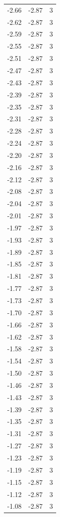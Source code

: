 \begin{longtable}{lrr}
  -2.66 & -2.87 & 3 \\
  -2.62 & -2.87 & 3 \\
  -2.59 & -2.87 & 3 \\
  -2.55 & -2.87 & 3 \\
  -2.51 & -2.87 & 3 \\
  -2.47 & -2.87 & 3 \\
  -2.43 & -2.87 & 3 \\
  -2.39 & -2.87 & 3 \\
  -2.35 & -2.87 & 3 \\
  -2.31 & -2.87 & 3 \\
  -2.28 & -2.87 & 3 \\
  -2.24 & -2.87 & 3 \\
  -2.20 & -2.87 & 3 \\
  -2.16 & -2.87 & 3 \\
  -2.12 & -2.87 & 3 \\
  -2.08 & -2.87 & 3 \\
  -2.04 & -2.87 & 3 \\
  -2.01 & -2.87 & 3 \\
  -1.97 & -2.87 & 3 \\
  -1.93 & -2.87 & 3 \\
  -1.89 & -2.87 & 3 \\
  -1.85 & -2.87 & 3 \\
  -1.81 & -2.87 & 3 \\
  -1.77 & -2.87 & 3 \\
  -1.73 & -2.87 & 3 \\
  -1.70 & -2.87 & 3 \\
  -1.66 & -2.87 & 3 \\
  -1.62 & -2.87 & 3 \\
  -1.58 & -2.87 & 3 \\
  -1.54 & -2.87 & 3 \\
  -1.50 & -2.87 & 3 \\
  -1.46 & -2.87 & 3 \\
  -1.43 & -2.87 & 3 \\
  -1.39 & -2.87 & 3 \\
  -1.35 & -2.87 & 3 \\
  -1.31 & -2.87 & 3 \\
  -1.27 & -2.87 & 3 \\
  -1.23 & -2.87 & 3 \\
  -1.19 & -2.87 & 3 \\
  -1.15 & -2.87 & 3 \\
  -1.12 & -2.87 & 3 \\
  -1.08 & -2.87 & 3 \\

\end{longtable}
